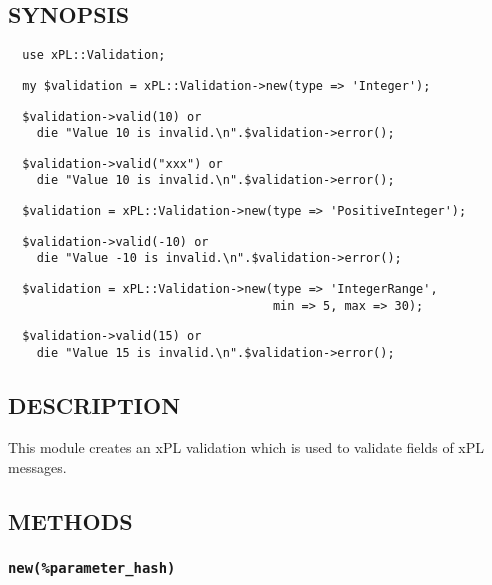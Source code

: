 \documentclass[12pt,a4paper]{article}
\begin{document}
\subsection*{SYNOPSIS\label{xPL::Validation_SYNOPSIS}}
\begin{verbatim}
  use xPL::Validation;
\end{verbatim}
\begin{verbatim}
  my $validation = xPL::Validation->new(type => 'Integer');
\end{verbatim}
\begin{verbatim}
  $validation->valid(10) or
    die "Value 10 is invalid.\n".$validation->error();
\end{verbatim}
\begin{verbatim}
  $validation->valid("xxx") or
    die "Value 10 is invalid.\n".$validation->error();
\end{verbatim}
\begin{verbatim}
  $validation = xPL::Validation->new(type => 'PositiveInteger');
\end{verbatim}
\begin{verbatim}
  $validation->valid(-10) or
    die "Value -10 is invalid.\n".$validation->error();
\end{verbatim}
\begin{verbatim}
  $validation = xPL::Validation->new(type => 'IntegerRange',
                                     min => 5, max => 30);
\end{verbatim}
\begin{verbatim}
  $validation->valid(15) or
    die "Value 15 is invalid.\n".$validation->error();
\end{verbatim}
\subsection*{DESCRIPTION\label{xPL::Validation_DESCRIPTION}}


This module creates an xPL validation which is used to validate fields
of xPL messages.

\subsection*{METHODS\label{xPL::Validation_METHODS}}
\subsubsection*{\texttt{new(\%parameter\_hash)}\label{xPL::Validation_new_parameter_hash_}}
\end{document}
